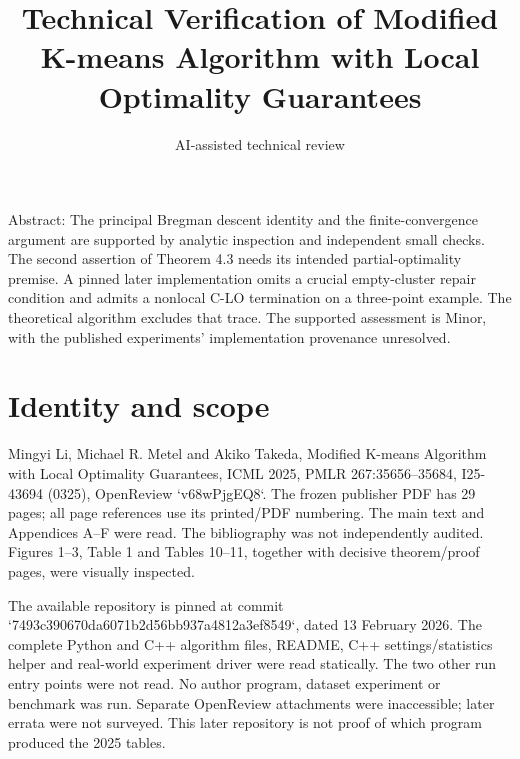 \documentclass[10pt]{article}
\title{Technical Verification of Modified K-means Algorithm with Local Optimality Guarantees}
\author{AI-assisted technical review}
\date{}
\begin{document}
\maketitle
Abstract: The principal Bregman descent identity and the finite-convergence argument are supported by analytic inspection and independent small checks. The second assertion of Theorem 4.3 needs its intended partial-optimality premise. A pinned later implementation omits a crucial empty-cluster repair condition and admits a nonlocal C-LO termination on a three-point example. The theoretical algorithm excludes that trace. The supported assessment is Minor, with the published experiments’ implementation provenance unresolved.\par
\section*{Identity and scope}
Mingyi Li, Michael R. Metel and Akiko Takeda, Modified K-means Algorithm with Local Optimality Guarantees, ICML 2025, PMLR 267:35656–35684, I25-43694 (0325), OpenReview `v68wPjgEQ8`. The frozen publisher PDF has 29 pages; all page references use its printed/PDF numbering. The main text and Appendices A–F were read. The bibliography was not independently audited. Figures 1–3, Table 1 and Tables 10–11, together with decisive theorem/proof pages, were visually inspected.\par
The available repository is pinned at commit `7493c390670da6071b2d56bb937a4812a3ef8549`, dated 13 February 2026. The complete Python and C++ algorithm files, README, C++ settings/statistics helper and real-world experiment driver were read statically. The two other run entry points were not read. No author program, dataset experiment or benchmark was run. Separate OpenReview attachments were inaccessible; later errata were not surveyed. This later repository is not proof of which program produced the 2025 tables.\par
\end{document}
